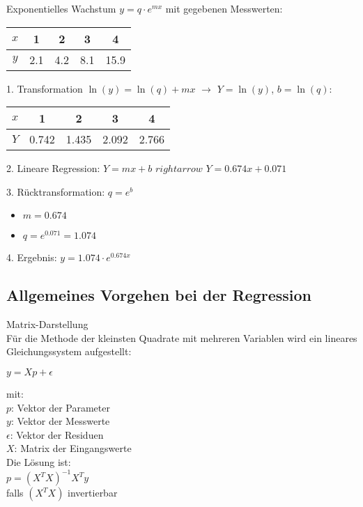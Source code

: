 \begin{example2}{Exponentielles Wachstum} $y=q \cdot e^{mx}$
mit gegebenen Messwerten:
\begin{center}
\begin{tabular}{|c|c|c|c|c|}
\hline
$x$ & 1 & 2 & 3 & 4 \\
\hline
$y$ & 2.1 & 4.2 & 8.1 & 15.9 \\
\hline
\end{tabular}
\end{center}

1. Transformation $\ln(y)=\ln(q)+mx$ $\rightarrow$ $Y=\ln(y)$, $b=\ln(q)$:
\begin{center}
\begin{tabular}{|c|c|c|c|c|}
\hline
$x$ & 1 & 2 & 3 & 4 \\
\hline
$Y$ & 0.742 & 1.435 & 2.092 & 2.766 \\
\hline
\end{tabular}
\end{center}

2. Lineare Regression: $Y=mx+b$ $rightarrow$ $Y = 0.674x + 0.071$

3. Rücktransformation: $q=e^b$
   \begin{itemize}
     \item $m = 0.674$
     \item $q = e^{0.071} = 1.074$
   \end{itemize}

4. Ergebnis: $y = 1.074 \cdot e^{0.674x}$
\end{example2}

\subsection{Allgemeines Vorgehen bei der Regression}

\begin{concept}{Matrix-Darstellung}\\
Für die Methode der kleinsten Quadrate mit mehreren Variablen wird ein lineares Gleichungssystem aufgestellt:

$y = Xp + \epsilon$

mit:\\
$p$: Vektor der Parameter\\
$y$: Vektor der Messwerte\\
$\epsilon$: Vektor der Residuen\\
$X$: Matrix der Eingangswerte\\

Die Lösung ist:\\
$p = (X^TX)^{-1}X^Ty$\\
falls $(X^TX)$ invertierbar
\end{concept}

